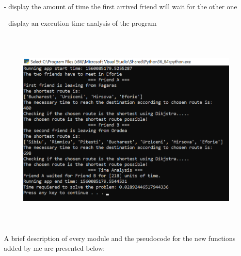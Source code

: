 \documentclass[12pt]{article}
\begin{document}
\begin{adjustwidth}{0.5in}{0.0in}
\begin{justify}
- display the amount of time the first arrived friend will wait for the other one
\end{justify}\par

\end{adjustwidth}

\begin{adjustwidth}{0.5in}{0.0in}
\begin{justify}
- display an execution time analysis of the program
\end{justify}\par

\end{adjustwidth}




\begin{figure}[H]
\advance\leftskip 0.62in		\includegraphics[width=5.86in,height=4.09in]{./media/image1.png}
\end{figure}



\par

\begin{justify}
A brief description of every module and the pseudocode for the new functions added by me are presented below:
\end{justify}\par
\end{document}
